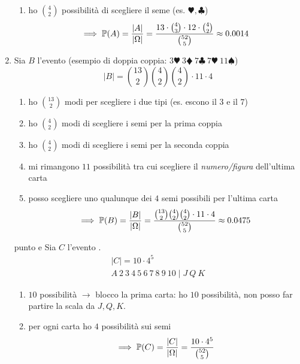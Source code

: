 \begin{enumerate}
\begin{enumerate}
		\item ho $\binom{4}{2}$ possibilità di scegliere il seme (es. $\varheartsuit ,\clubsuit $)
		\begin{equation*}
			\implies \mathbb{P}(A) =\frac{| A| }{|\Omega| } =\frac{13\cdot \binom{4}{3} \cdot 12\cdot \binom{4}{2}}{\binom{52}{5}} \approx 0.0014
		\end{equation*}
	\end{enumerate}
	\item Sia $B$ l'evento  (esempio di doppia coppia: $3\varheartsuit \ 3\vardiamondsuit \ 7\clubsuit \ 7\varheartsuit \ 11\spadesuit $)
	\begin{equation*}
		| B| =\binom{13}{2}\binom{4}{2}\binom{4}{2} \cdot 11\cdot 4
	\end{equation*}
	\begin{enumerate}
		\item ho $\binom{13}{2}$ modi per scegliere i due tipi (es. escono il $3$ e il $7$)
		\item ho $\binom{4}{2}$ modi di scegliere i semi per la prima coppia
		\item ho $\binom{4}{2}$ modi di scegliere i semi per la seconda coppia
		\item mi rimangono $11$ possibilità tra cui scegliere il \textit{numero/figura} dell'ultima carta
		\item posso scegliere uno qualunque dei $4$ semi possibili per l'ultima carta
		\begin{equation*}
			\implies \mathbb{P}(B) =\frac{| B| }{|\Omega| } =\frac{\binom{13}{2}\binom{4}{2}\binom{4}{2} \cdot 11\cdot 4}{\binom{52}{5}} \approx 0.0475
		\end{equation*}
	\end{enumerate}
	\item [punto e] Sia $C$ l'evento .
	\begin{gather*}
		| C| =10\cdot 4^{5}\\
		A\ 2\ 3\ 4\ 5\ 6\ 7\ 8\ 9\ 10 \mid J\ Q\ K
	\end{gather*}
	\begin{enumerate}
		\item $10$ possibilità $\rightarrow $ blocco la prima carta: ho $10$ possibilità, non posso far partire la scala da $J,Q,K$.
		\item per ogni carta ho $4$ possibilità sui semi
		\begin{equation*}
			\implies \mathbb{P}(C) =\frac{| C| }{|\Omega| } =\frac{10\cdot 4^{5}}{\binom{52}{5}}
		\end{equation*}

\end{enumerate}
\end{enumerate}
